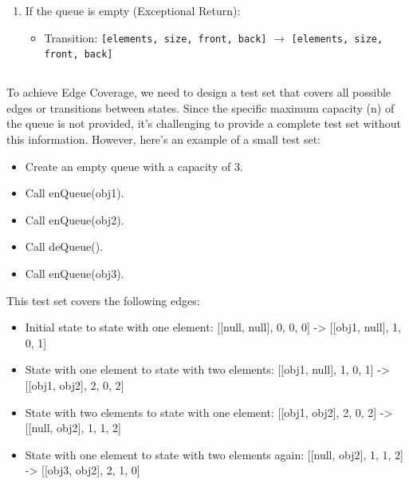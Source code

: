 \documentclass{article}
\begin{document}
\begin{latin}
\begin{itemize}
\begin{enumerate}
\item If the queue is empty (Exceptional Return):
\begin{itemize}
  \item Transition: \texttt{[elements, size, front, back]} $\rightarrow$ \texttt{[elements, size, front, back]}
\end{itemize}

\end{enumerate}

\end{itemize}

\subsection{}
To achieve Edge Coverage, we need to design a test set that covers all possible edges or transitions between states. Since the specific maximum capacity (n) of the queue is not provided, it's challenging to provide a complete test set without this information. However, here's an example of a small test set:

\begin{itemize}
\item Create an empty queue with a capacity of 3.
\item Call enQueue(obj1).
\item Call enQueue(obj2).
\item Call deQueue().
\item Call enQueue(obj3).
\end{itemize}

This test set covers the following edges:

\begin{itemize}
\item Initial state to state with one element: [[null, null], 0, 0, 0] -> [[obj1, null], 1, 0, 1]
\item State with one element to state with two elements: [[obj1, null], 1, 0, 1] -> [[obj1, obj2], 2, 0, 2]
\item State with two elements to state with one element: [[obj1, obj2], 2, 0, 2] -> [[null, obj2], 1, 1, 2]
\item State with one element to state with two elements again: [[null, obj2], 1, 1, 2] -> [[obj3, obj2], 2, 1, 0]
\end{itemize}

\end{latin}






\end{document}
